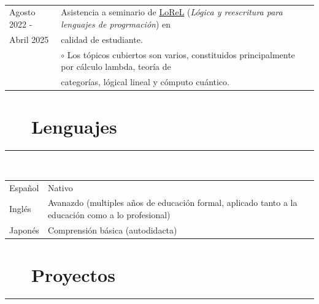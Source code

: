 \documentclass{article}
\newcommand{\shade}[1]{\textcolor{myGray}{#1}}
\begin{document}
\
\newline
\

\begin{longtable}{l | l}
Agosto 2022 - & Asistencia a seminario de \href{https://lorel-team.github.io}{LoReL} (\textit{Lógica y reescritura para lenguajes de progrmación}) en \\
Abril 2025  & calidad de estudiante. \\
& \indent $\circ$ \shade{Los tópicos cubiertos son varios, constituidos principalmente por cálculo lambda, teoría de} \\ & \indent \shade{categorías, lógical lineal y cómputo cuántico.}
\end{longtable}


\section*{\faLanguage ~~ Lenguajes}
\hrule

\
\newline
\

\begin{longtable}{l | l}
    Español & Nativo \\
    Inglés & Avanazdo \shade{(multiples años de educación formal, aplicado tanto a la educación como a lo profesional)}\\
    Japonés & Comprensión básica \shade{(autodidacta)}
\end{longtable}

\section*{\faFileCodeO ~~ Proyectos}
\hrule
\
\end{document}
